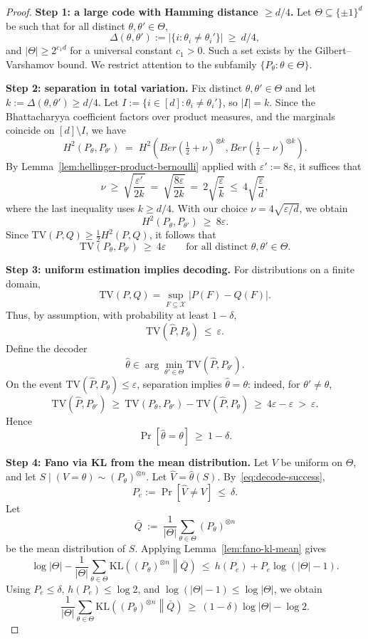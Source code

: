 \documentclass[10pt,a4paper]{amsart}
\newcommand{\Ber}{Ber}
\newcommand{\KL}{\mathrm{KL}}
\newcommand{\TV}{\mathrm{TV}}
\newcommand{\X}{\mathcal{X}}
\newcommand{\eps}{\varepsilon}
\begin{document}
\begin{proof}
\medskip
\noindent\textbf{Step 1: a large code with Hamming distance $\ge d/4$.}
Let $\Theta\subseteq\{\pm1\}^d$ be such that for all distinct
$\theta,\theta'\in\Theta$,
\[
\Delta(\theta,\theta'):=|\{i:\theta_i\neq\theta_i'\}|\ \ge\ d/4,
\]
and $|\Theta|\ge 2^{c_1 d}$ for a universal constant $c_1>0$.
Such a set exists by the Gilbert--Varshamov bound.
We restrict attention to the subfamily $\{P_\theta:\theta\in\Theta\}$.

\medskip
\noindent\textbf{Step 2: separation in total variation.}
Fix distinct $\theta,\theta'\in\Theta$ and let $k:=\Delta(\theta,\theta')\ge d/4$.
Let $I:=\{i\in[d]:\theta_i\neq\theta_i'\}$, so $|I|=k$.
Since the Bhattacharyya coefficient factors over product measures,
and the marginals coincide on $[d]\setminus I$, we have
\[
H^2(P_\theta,P_{\theta'}) \;=\; H^2\!\left(\Ber(\tfrac12+\nu)^{\otimes k},
\Ber(\tfrac12-\nu)^{\otimes k}\right).
\]
By Lemma~\ref{lem:hellinger-product-bernoulli} applied with $\eps' := 8\eps$,
it suffices that
\[
\nu \ \ge\ \sqrt{\frac{\eps'}{2k}}
\ =\ \sqrt{\frac{8\eps}{2k}}
\ =\ 2\sqrt{\frac{\eps}{k}}
\ \le\ 4\sqrt{\frac{\eps}{d}},
\]
where the last inequality uses $k\ge d/4$.
With our choice $\nu = 4\sqrt{\eps/d}$, we obtain
\[
H^2(P_\theta,P_{\theta'}) \ \ge\ 8\eps .
\]
Since $\TV(P,Q)\ge \tfrac12 H^2(P,Q)$, it follows that
\[
\TV(P_\theta,P_{\theta'}) \ \ge\ 4\eps
\qquad
\text{for all distinct }\theta,\theta'\in\Theta.
\]

\medskip
\noindent\textbf{Step 3: uniform estimation implies decoding.}
For distributions on a finite domain,
\[
\TV(P,Q)=\sup_{F\subseteq\X}|P(F)-Q(F)|.
\]
Thus, by assumption, with probability at least $1-\delta$,
\[
\TV(\widehat P,P_\theta)\ \le\ \eps.
\]
Define the decoder
\[
\widehat\theta
\in \arg\min_{\theta'\in\Theta} \TV(\widehat P,P_{\theta'}).
\]
On the event $\TV(\widehat P,P_\theta)\le\eps$, separation implies
$\widehat\theta=\theta$: indeed, for $\theta'\neq\theta$,
\[
\TV(\widehat P,P_{\theta'})
\ \ge\ \TV(P_\theta,P_{\theta'})-\TV(\widehat P,P_\theta)
\ \ge\ 4\eps-\eps
\ >\ \eps.
\]
Hence
\begin{equation}\label{eq:decode-success}
\Pr[\widehat\theta=\theta]\ \ge\ 1-\delta.
\end{equation}

\medskip
\noindent\textbf{Step 4: Fano via KL from the mean distribution.}
Let $V$ be uniform on $\Theta$, and let
$S\mid(V=\theta)\sim(P_\theta)^{\otimes n}$.
Let $\widehat V=\widehat\theta(S)$.
By~\eqref{eq:decode-success},
\[
P_e:=\Pr[\widehat V\neq V]\ \le\ \delta.
\]
Let
\[
\bar Q \ :=\ \frac1{|\Theta|}\sum_{\theta\in\Theta}(P_\theta)^{\otimes n}
\]
be the mean distribution of $S$.
Applying Lemma~\ref{lem:fano-kl-mean} gives
\begin{equation}\label{eq:fano-mean}
\log|\Theta|-\frac1{|\Theta|}\sum_{\theta\in\Theta}
\KL\!\left((P_\theta)^{\otimes n}\middle\|\bar Q\right)
\ \le\ h(P_e)+P_e\log(|\Theta|-1).
\end{equation}
Using $P_e\le\delta$, $h(P_e)\le\log2$, and $\log(|\Theta|-1)\le\log|\Theta|$,
we obtain
\[
\frac1{|\Theta|}\sum_{\theta\in\Theta}
\KL\!\left((P_\theta)^{\otimes n}\middle\|\bar Q\right)
\ \ge\ (1-\delta)\log|\Theta|-\log2.
\]


\end{proof}
\end{document}
